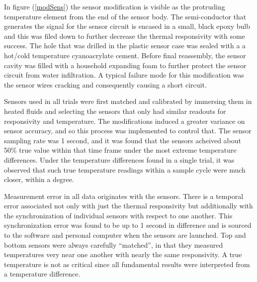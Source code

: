 In figure (\ref{modSens}) the sensor modification is visible as the protruding temperature element from the end of the sensor body. The semi-conductor that generates the signal for the sensor circuit is encased in a small, black epoxy bulb and this was filed down to further decrease the thermal responsivity with some success. The hole that was drilled in the plastic sensor case was sealed with a a hot/cold temperature cyanoacrylate cement. Before final reassembly, the sensor cavity was filled with a household expanding foam to further protect the sensor circuit from water infiltration. A typical failure mode for this modification was the sensor wires cracking and consequently causing a short circuit. 

Sensors used in all trials were first matched and calibrated by immersing them in heated fluids and selecting the sensors that only had similar readouts for responsivity and temperature. The modifications induced a greater variance on sensor accuracy, and so this process was implemented to control that. The sensor sampling rate was 1 second, and it was found that the sensors acheived about 50\% true value within that time frame under the most extreme temperature differences. Under the temperature differences found in a single trial, it was observed that such true temperature readings within a sample cycle were much closer, within a degree. 

Measurement error in all data originates with the sensors. There is a temporal error associated not only with just the thermal responsivity but additionally with the synchronization of individual sensors with respect to one another. This synchronization error was found to be up to 1 second in difference and is sourced to the software and personal computer when the sensors are launched. Top and bottom sensors were always carefully ``matched'', in that they measured temperatures very near one another with nearly the same responsivity. A true temperature is not as critical since all fundamental results were interpreted from a temperature difference.

